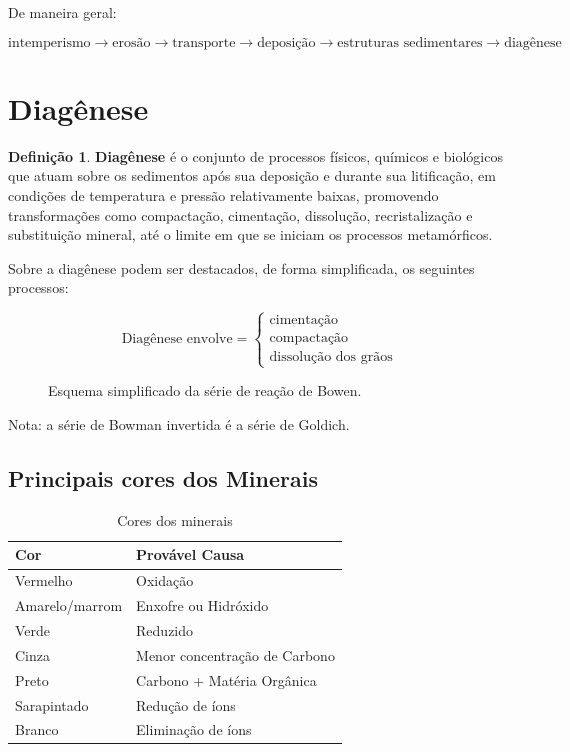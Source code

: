 \documentclass[a4paper,12pt]{article}
\theoremstyle{definition}
\theoremstyle{definition}
\theoremstyle{definition}
\newtheorem{definicao}{Definição}[section]
\begin{document}
De maneira geral:

\[
\boxed{
\text{intemperismo}
\rightarrow
\text{erosão}
\rightarrow
\text{transporte}
\rightarrow
\text{deposição}
\rightarrow
\text{estruturas sedimentares}
\rightarrow
\text{diagênese}
}
\]



\section{Diagênese}

\begin{definicao}
    \textbf{Diagênese} é o conjunto de processos físicos, químicos e biológicos que atuam sobre os sedimentos após sua deposição e durante sua litificação, em condições de temperatura e pressão relativamente baixas, promovendo transformações como compactação, cimentação, dissolução, recristalização e substituição mineral, até o limite em que se iniciam os processos metamórficos.
\end{definicao}

Sobre a diagênese podem ser destacados, de forma simplificada, os seguintes
processos:

\[
\text{Diagênese envolve} =
\left\{
\begin{array}{l}
\text{cimentação} \\
\text{compactação} \\
\text{dissolução dos grãos}
\end{array}
\right.
\]


\begin{figure}[H]
    \centering
    
    \caption{Esquema simplificado da série de reação de Bowen.}
    \label{fig:bowen}
\end{figure}

Nota: a série de Bowman invertida é a série de Goldich.

\subsection{Principais cores dos Minerais}

\begin{table}[H]
    \centering
\begin{tabular}{ll}
    \toprule
        \textbf{Cor} & \textbf{Provável Causa} \\
    \midrule
        Vermelho & Oxidação \\
        Amarelo/marrom & Enxofre ou Hidróxido \\
        Verde & Reduzido \\
        Cinza & Menor concentração de Carbono \\
        Preto & Carbono + Matéria Orgânica \\
        Sarapintado & Redução de íons \\
        Branco & Eliminação de íons\\
    \bottomrule
     \end{tabular}
\caption{Cores dos minerais}
\label{tab:minerais}
\end{table}
\end{document}

